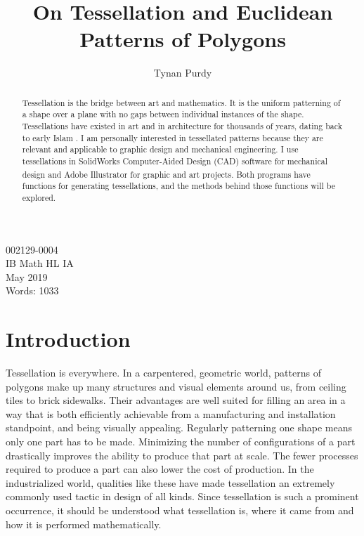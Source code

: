 \documentclass[12pt,letterpaper]{article}
\title{On Tessellation and Euclidean Patterns of Polygons}
\author{Tynan Purdy}
\date{\vspace{-5ex}}
\begin{document}
\large
\parindent=0.5in
{\fontsize{12}{14.4}
	{\singlespace
	\maketitle
	\begin{center}
	\vspace{4mm}
	002129-0004 \\
	\vspace{4mm}
	IB Math HL IA \\
	\vspace{4mm}
	May 2019 \\
	\vspace{4mm}
	Words: 1033\\
	\end{center}
	}
}	

\newpage
{}
\begin{abstract}
Tessellation is the bridge between art and mathematics. It is the uniform patterning of a shape over a plane with no gaps between individual instances of the shape. Tessellations have existed in art and in architecture for thousands of years, dating back to early Islam \citep{arabic}. I am personally interested in tessellated patterns because they are relevant and applicable to graphic design and mechanical engineering. I use tessellations in SolidWorks Computer-Aided Design (CAD) software for mechanical design and Adobe Illustrator\textsuperscript{\textregistered} for graphic and art projects. Both programs have functions for generating tessellations, and the methods behind those functions will be explored.
\end{abstract}

\newpage
\tableofcontents

\newpage
\section{Introduction}
Tessellation is everywhere. In a carpentered, geometric world, patterns of polygons make up many structures and visual elements around us, from ceiling tiles to brick sidewalks. Their advantages are well suited for filling an area in a way that is both efficiently achievable from a manufacturing and installation standpoint, and being visually appealing. Regularly patterning one shape means only one part has to be made. Minimizing the number of configurations of a part drastically improves the ability to produce that part at scale. The fewer processes required to produce a part can also lower the cost of production. In the industrialized world, qualities like these have made tessellation an extremely commonly used tactic in design of all kinds. Since tessellation is such a prominent occurrence, it should be understood what tessellation is, where it came from and how it is performed mathematically.
\end{document}
